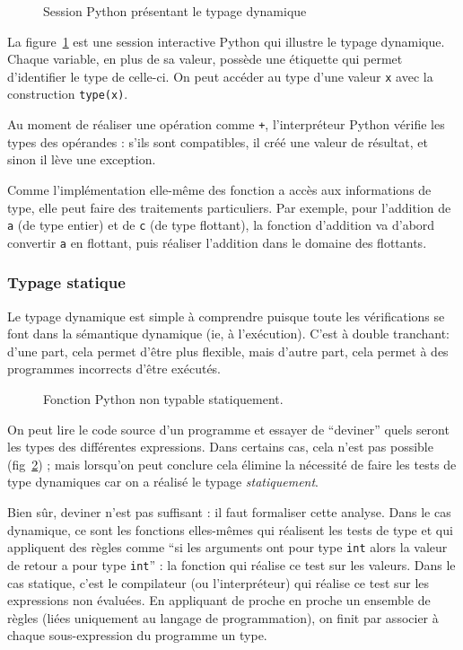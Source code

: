 \begin{figure}
  \caption{Session Python présentant le typage dynamique}
  \label{fig:typage-dynamique}
\end{figure}

La figure~\ref{fig:typage-dynamique} est une session interactive Python qui
illustre le typage dynamique. Chaque variable, en plus de sa valeur, possède une
étiquette qui permet d'identifier le type de celle-ci. On peut accéder au type
d'une valeur \texttt{x} avec la construction \texttt{type(x)}.

Au moment de réaliser une opération comme \texttt{+}, l'interpréteur Python
vérifie les types des opérandes : s'ils sont compatibles, il créé une valeur de
résultat, et sinon il lève une exception.

Comme l'implémentation elle-même des fonction a accès aux informations de type,
elle peut faire des traitements particuliers. Par exemple, pour l'addition de
\texttt{a} (de type entier) et de \texttt{c} (de type flottant), la fonction
d'addition va d'abord convertir \texttt{a} en flottant, puis réaliser l'addition
dans le domaine des flottants.

\subsubsection{Typage statique}

Le typage dynamique est simple à comprendre puisque toute les vérifications se
font dans la sémantique dynamique (ie, à l'exécution). C'est à double tranchant:
d'une part, cela permet d'être plus flexible, mais d'autre part, cela permet à
des programmes incorrects d'être exécutés.

\begin{figure}
  \caption{Fonction Python non typable statiquement.}
  \label{fig:nontypable}
\end{figure}

On peut lire le code source d'un programme et essayer de ``deviner'' quels
seront les types des différentes expressions. Dans certains cas, cela n'est pas
possible (fig~\ref{fig:nontypable}) ; mais lorsqu'on peut conclure cela élimine
la nécessité de faire les tests de type dynamiques car on a réalisé le typage
\emph{statiquement}.

Bien sûr, deviner n'est pas suffisant : il faut formaliser cette analyse. Dans
le cas dynamique, ce sont les fonctions elles-mêmes qui réalisent les tests de
type et qui appliquent des règles comme ``si les arguments ont pour type
\texttt{int} alors la valeur de retour a pour type \texttt{int}'' : la
fonction qui réalise ce test sur les valeurs. Dans le cas statique,
c'est le compilateur (ou l'interpréteur) qui réalise ce test sur les
expressions non évaluées. En
appliquant de proche en proche un ensemble de règles (liées uniquement au
langage de programmation), on finit par associer à chaque sous-expression du
programme un type.

